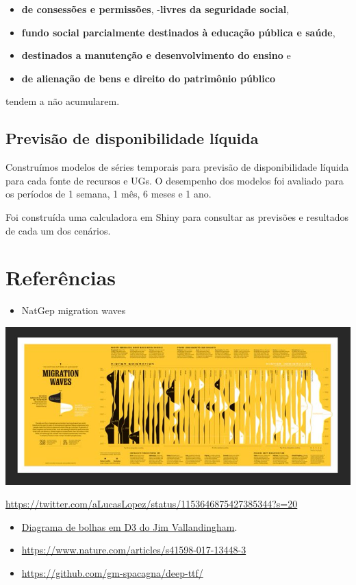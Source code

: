 \documentclass[
]{book}
\providecommand{\tightlist}{%
  \setlength{\itemsep}{0pt}\setlength{\parskip}{0pt}}
\begin{document}
\begin{itemize}
\tightlist
\item
  \textbf{de consessões e permissões},
  -\textbf{livres da seguridade social},
\item
  \textbf{fundo social parcialmente destinados à educação pública e saúde},
\item
  \textbf{destinados a manutenção e desenvolvimento do ensino} e
\item
  \textbf{de alienação de bens e direito do patrimônio público}
\end{itemize}

tendem a não acumularem.

\hypertarget{previsuxe3o-de-disponibilidade-luxedquida}{%
\section{Previsão de disponibilidade líquida}\label{previsuxe3o-de-disponibilidade-luxedquida}}

Construímos modelos de séries temporais para previsão de disponibilidade líquida para cada fonte de recursos e UGs.
O desempenho dos modelos foi avaliado para os períodos de 1 semana, 1 mês, 6 meses e 1 ano.

Foi construída uma calculadora em Shiny para consultar as previsões e resultados de cada um dos cenários.

\hypertarget{referuxeancias}{%
\chapter*{Referências}\label{referuxeancias}}

\begin{itemize}
\tightlist
\item
  NatGep migration waves
\end{itemize}

\includegraphics{natgeo.jpg}

\url{https://twitter.com/aLucasLopez/status/1153646875427385344?s=20}

\begin{itemize}
\item
  \href{https://vallandingham.me/bubble_charts_with_d3v4.html}{Diagrama de bolhas em D3 do Jim Vallandingham}.
\item
  \url{https://www.nature.com/articles/s41598-017-13448-3}
\item
  \url{https://github.com/gm-spacagna/deep-ttf/}
\end{itemize}

\backmatter
  
\end{document}
